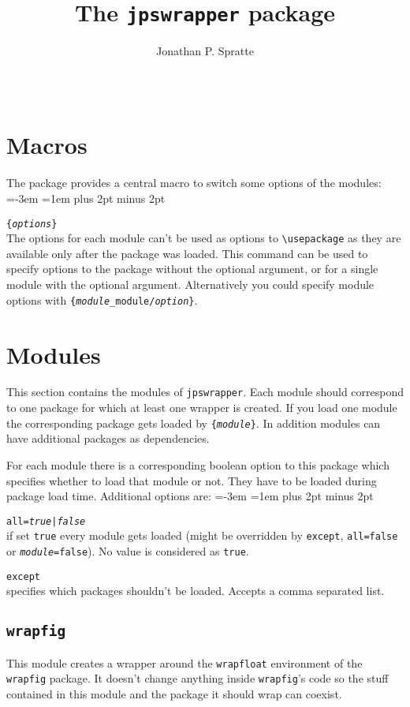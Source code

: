 \documentclass[a4paper,10pt]{scrartcl}
\title{The \texttt{jpswrapper} package}
\author{Jonathan P. Spratte}
\date{\jpswrapper@version\ \ \jpswrapper@date}
\newenvironment{codedescription}{%
  \parindent=-3em
  \parskip=1em plus 2pt minus 2pt
  \par
}{\par}
\newcommand*\optionTF{\textit{true}{\normalfont|}\textit{false}}
\begin{document}
\maketitle
\tableofcontents
\section{Macros}
The package provides a central macro to switch some options of the modules:
\begin{codedescription}
\texttt{\string{}\{\textit{options}\}}\\
  The options for each module can't be used as options to \verb|\usepackage| as
  they are available only after the package was loaded. This command can be used
  to specify options to the package without the optional argument, or for a
  single module with the optional argument. Alternatively you could specify
  module options with
  \texttt{\string\JPSWrapperOptions\{\textit{module}\_module/\textit{option}\}}.
\end{codedescription}

\section{Modules}
This section contains the modules of \texttt{jpswrapper}. Each module should
correspond to one package for which at least one wrapper is created. If you
load one module the corresponding package gets loaded by
\texttt{\string\RequirePackage\{\textit{module}\}}. In addition modules can have
additional packages as dependencies.

For each module there is a corresponding boolean option to this package which
specifies whether to load that module or not. They have to be loaded during
package load time. Additional options are:
\begin{codedescription}
\texttt{all=\optionTF}\\
  if set \texttt{true} every module gets loaded (might be overridden by
  \texttt{except}, \texttt{all=false} or \texttt{\textit{module}=false}). No
  value is considered as \texttt{true}.

\texttt{except}\\
  specifies which packages shouldn't be loaded. Accepts a comma separated list.
\end{codedescription}

\subsection{\texttt{wrapfig}}
This module creates a wrapper around the \texttt{wrapfloat} environment of the
\texttt{wrapfig} package. It doesn't change anything inside \texttt{wrapfig}'s
code so the stuff contained in this module and the package it should wrap can
coexist.
\end{document}
